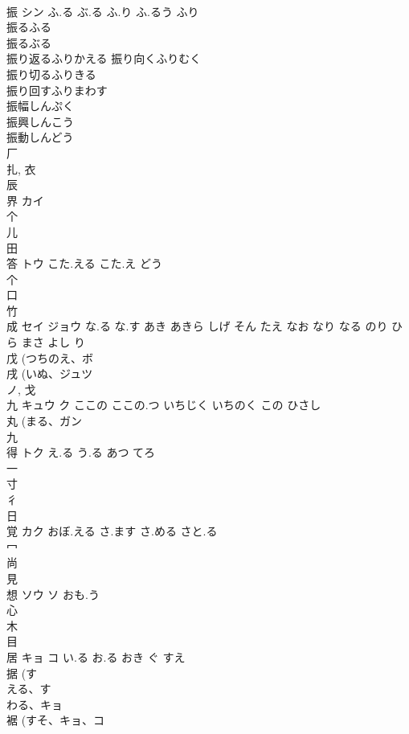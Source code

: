 \documentclass[8pt]{extreport}
\begin{document}
\begin{CJK}{UTF8}{min}
\\	振	シン	ふ.る ぶ.る ふ.り ふ.るう ふり	
\\	振るふる 
\\	振るぶる 
\\	振り返るふりかえる 振り向くふりむく 
\\	振り切るふりきる 
\\	振り回すふりまわす 
\\	振幅しんぷく 
\\	振興しんこう 
\\	振動しんどう 
\\	厂 
\\	扎, 衣 
\\	辰 
\\	界	カイ		
\\	个 
\\	儿 
\\	田 
\\	答	トウ	こた.える こた.え どう	
\\	个 
\\	口 
\\	竹 
\\	成	セイ ジョウ	な.る な.す あき あきら しげ そん たえ なお なり なる のり ひら まさ よし り	
\\	戊 (つちのえ、ボ 
\\	戌 (いぬ、ジュツ 
\\	ノ, 戈 
\\	九	キュウ ク	ここの ここの.つ いちじく いちのく この ひさし	
\\	丸 (まる、ガン 
\\	九 
\\	得	トク	え.る う.る あつ てろ	
\\	一 
\\	寸 
\\	彳 
\\	日 
\\	覚	カク	おぼ.える さ.ます さ.める さと.る	
\\	冖 
\\	尚 
\\	見 
\\	想	ソウ ソ	おも.う	
\\	心 
\\	木 
\\	目 
\\	居	キョ コ	い.る お.る おき ぐ すえ	
\\	据 (す
\\	える、す
\\	わる、キョ 
\\	裾 (すそ、キョ、コ 

\end{CJK}
\end{document}
